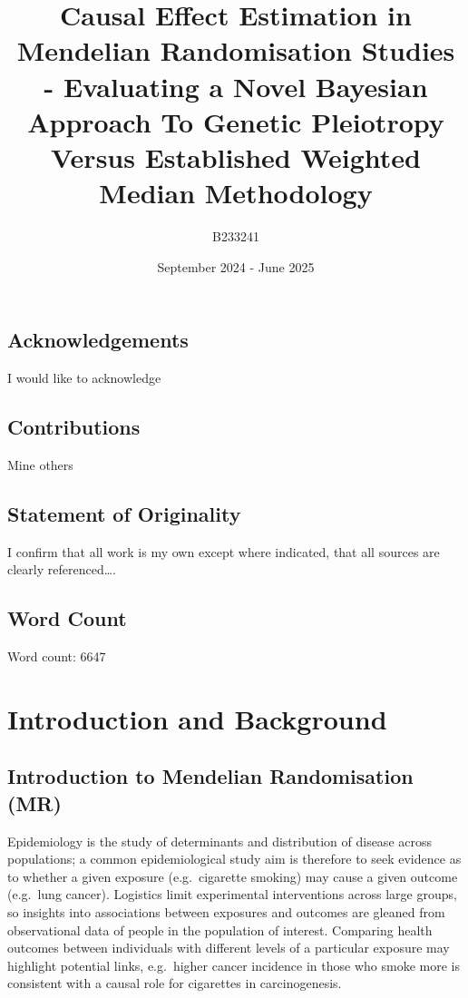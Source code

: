 \documentclass[
]{article}
\title{Causal Effect Estimation in Mendelian Randomisation Studies - Evaluating a Novel Bayesian Approach To Genetic Pleiotropy Versus Established Weighted Median Methodology}
\author{B233241}
\date{September 2024 - June 2025}
\begin{document}
\maketitle

{
\hypersetup{linkcolor=}
\setcounter{tocdepth}{2}
\tableofcontents
}
\newpage

\subsection*{Acknowledgements}\label{acknowledgements}

I would like to acknowledge

\subsection*{Contributions}\label{contributions}

Mine others

\subsection*{Statement of Originality}\label{statement-of-originality}

I confirm that all work is my own except where indicated, that all sources are clearly referenced\ldots.

\subsection*{Word Count}\label{word-count}

Word count:
6647

\newpage

\section{Introduction and Background}\label{introduction-and-background}

\subsection{Introduction to Mendelian Randomisation (MR)}\label{introduction-to-mendelian-randomisation-mr}

Epidemiology is the study of determinants and distribution of disease across populations; a common epidemiological study aim is therefore to seek evidence as to whether a given exposure (e.g.~cigarette smoking) may cause a given outcome (e.g.~lung cancer)\textsuperscript{}. Logistics limit experimental interventions across large groups, so insights into associations between exposures and outcomes are gleaned from observational data of people in the population of interest. Comparing health outcomes between individuals with different levels of a particular exposure may highlight potential links, e.g.~higher cancer incidence in those who smoke more is consistent with a causal role for cigarettes in carcinogenesis\textsuperscript{}.
\end{document}
